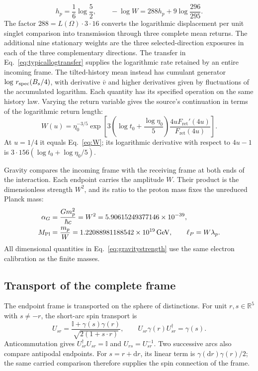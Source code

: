 \documentclass[aps,prx,onecolumn,10pt,notitlepage,nofootinbib,longbibliography]{revtex4-2}
\numberwithin{equation}{section}
\numberwithin{table}{section}
\newcommand{\Id}{\mathbb I}
\newcommand{\RR}{\mathbb R}
\newcommand{\dd}{\mathrm d}
\newcommand{\GeV}{\,\mathrm{GeV}}
\newcommand{\MP}{M_{\mathrm{Pl}}}
\newcommand{\lamP}{\lambda_p}
\newcommand{\Fret}{F_{\mathrm{ret}}}
\begin{document}
\begin{equation}
 h_p=\frac16\log\frac52,\qquad
 -\log W=288h_p+9\log\frac{296}{295}.
 \label{eq:protonbridge}
\end{equation}
The factor $288=L(\Omega)\cdot3\cdot16$ converts the logarithmic displacement per unit singlet comparison into transmission through three complete mean returns. The additional nine stationary weights are the three selected-direction exposures in each of the three complementary directions. The transfer in Eq.~\eqref{eq:typicallogtransfer} supplies the logarithmic rate retained by an entire incoming frame. The tilted-history mean instead has cumulant generator $\log\,r_{\rm spec}(B_s/4)$, with derivative $\bar v$ and higher derivatives given by fluctuations of the accumulated logarithm. Each quantity has its specified operation on the same history law. Varying the return variable gives the source's continuation in terms of the logarithmic return length:
\begin{equation}
 W(u)=\eta_0^{-3/5}\exp\!\left[
 3\left(\log t_0+\frac{\log\eta_0}{5}\right)
 \frac{4u\Fret'(4u)}{\Fret(4u)}\right].
\end{equation}
At $u=1/4$ it equals Eq.~\eqref{eq:W}; its logarithmic derivative with respect to $4u-1$ is $3\cdot156(\log t_0+\log\eta_0/5)$.

Gravity compares the incoming frame with the receiving frame at both ends of the interaction. Each endpoint carries the amplitude $W$. Their product is the dimensionless strength $W^2$, and its ratio to the proton mass fixes the unreduced Planck mass:
\begin{align}
 \alpha_G&=\frac{Gm_p^2}{\hbar c}=W^2=5.90615249377146\times10^{-39},\notag\\
 \MP&=\frac{m_p}{W}=1.22088981188542\times10^{19}\GeV,
 \qquad \ell_P=W\lamP.
 \label{eq:gravitystrength}
\end{align}
All dimensional quantities in Eq.~\eqref{eq:gravitystrength} use the same electron calibration as the finite masses.

\subsection{Transport of the complete frame}
The endpoint frame is transported on the sphere of distinctions. For unit
$r,s\in\RR^5$ with $s\ne-r$, the short-arc spin transport is
\begin{equation}
 U_{sr}=\frac{\Id+\gamma(s)\gamma(r)}{\sqrt{2(1+s\cdot r)}},\qquad
 U_{sr}\gamma(r)U_{sr}^\dagger=\gamma(s).
 \label{eq:sphere_transport}
\end{equation}
Anticommutation gives $U_{sr}^\dagger U_{sr}=\Id$ and
$U_{rs}=U_{sr}^{-1}$. Two successive arcs also compare antipodal endpoints.
For $s=r+\dd r$, its linear term is $\gamma(\dd r)\gamma(r)/2$;
the same carried comparison therefore supplies the spin connection of the frame.
\end{document}
